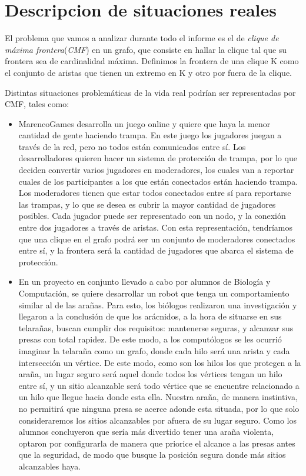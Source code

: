 \section{Descripcion de situaciones reales}
El problema que vamos a analizar durante todo el informe es el de \textit{clique de máxima frontera}(\textit{CMF}) en un grafo, que consiste en hallar la clique tal que su frontera sea de cardinalidad máxima. Definimos la frontera de una clique K como el conjunto de aristas que tienen un extremo en K y otro por fuera de la clique.

Distintas situaciones problemáticas de la vida real podrían ser representadas por CMF, tales como:

\begin{itemize}

\item MarencoGames desarrolla un juego online y quiere que haya la menor cantidad de gente haciendo trampa. En este juego los jugadores juegan a través de la red, pero no todos están comunicados entre sí. Los desarrolladores quieren hacer un sistema de protección de trampa, por lo que deciden convertir varios jugadores en moderadores, los cuales van a reportar cuales de los participantes a los que están conectados están haciendo trampa. Los moderadores tienen que estar todos conectados entre sí para reportarse las trampas, y lo que se desea es cubrir la mayor cantidad de jugadores posibles.  Cada jugador puede ser representado con un nodo, y la conexión entre dos jugadores a través de aristas. Con esta representación, tendríamos que una clique en el grafo podrá ser un conjunto de moderadores conectados entre sí, y la frontera será la cantidad de jugadores que abarca el sistema de protección.

\item En un proyecto en conjunto llevado a cabo por alumnos de Biología y Computación, se quiere desarrollar un robot que tenga un comportamiento similar al de las arañas. Para esto, los biólogos realizaron una investigación y llegaron a la conclusión de que los arácnidos, a la hora de situarse en sus telarañas, buscan cumplir dos requisitos: mantenerse seguras, y alcanzar sus presas con total rapidez. De este modo, a los computólogos se les ocurrió imaginar la telaraña como un grafo, donde cada hilo será una arista y cada intersección un vértice. De este modo, como son los hilos los que protegen a la araña, un lugar seguro será aquel donde todos los vértices tengan un hilo entre sí, y un sitio alcanzable será todo vértice que se encuentre relacionado a un hilo que llegue hacia donde esta ella. Nuestra araña, de manera instintiva, no permitirá que ninguna presa se acerce adonde esta situada, por lo que solo consideraremos los sitios alcanzables por afuera de su lugar seguro. Como los alumnos concluyeron que sería más divertido tener una araña violenta, optaron por configurarla de manera que priorice el alcance a las presas antes que la seguridad, de modo que busque la posición segura donde más sitios alcanzables haya.

\end{itemize}


